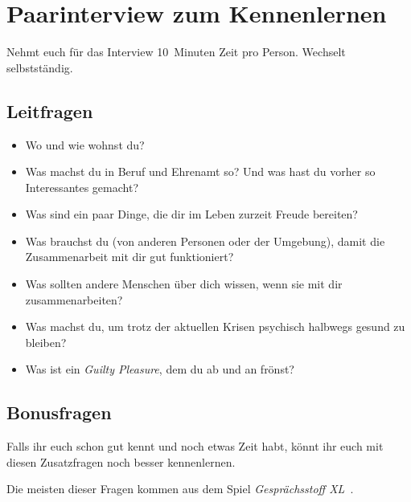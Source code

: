 \section{Paarinterview zum Kennenlernen}
\label{paarinterview}

Nehmt euch für das Interview 10~Minuten Zeit pro Person. Wechselt selbstständig.

\subsection{Leitfragen}

\begin{itemize}
  \item Wo und wie wohnst du?
  \item Was machst du in Beruf und Ehrenamt so? Und was hast du vorher so Interessantes gemacht?
  \item Was sind ein paar Dinge, die dir im Leben zurzeit Freude bereiten?
  \item Was brauchst du (von anderen Personen oder der Umgebung), damit die Zusammenarbeit mit dir gut funktioniert?
  \item Was sollten andere Menschen über dich wissen, wenn sie mit dir zusammenarbeiten?
  \item Was machst du, um trotz der aktuellen Krisen psychisch halbwegs gesund zu bleiben?
  \item Was ist ein \emph{Guilty Pleasure}, dem du ab und an frönst?
\end{itemize}


\subsection{Bonusfragen}

Falls ihr euch schon gut kennt und noch etwas Zeit habt, könnt ihr euch mit diesen Zusatzfragen noch besser kennenlernen.

Die meisten dieser Fragen kommen aus dem Spiel \emph{Gesprächsstoff XL}~\cite{gespraechsstoff}.

